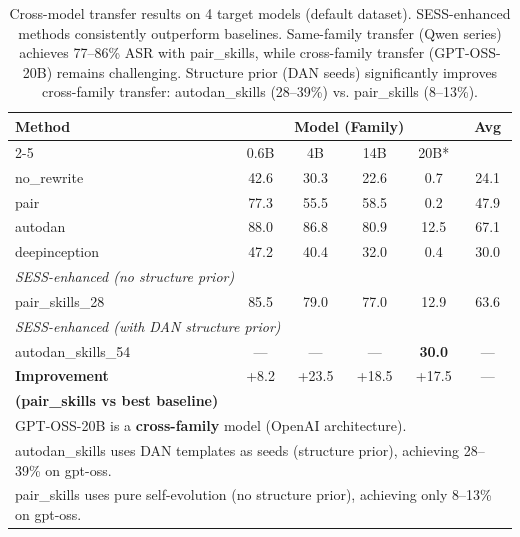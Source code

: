 \begin{table}[t]
\centering
\caption{Cross-model transfer results on 4 target models (default dataset). SESS-enhanced methods consistently outperform baselines. Same-family transfer (Qwen series) achieves 77--86\% ASR with pair\_skills, while cross-family transfer (GPT-OSS-20B) remains challenging. Structure prior (DAN seeds) significantly improves cross-family transfer: autodan\_skills (28--39\%) vs. pair\_skills (8--13\%).}
\label{tab:transfer_models}
\small
\begin{tabular}{lccccc}
\toprule
\textbf{Method} & \multicolumn{4}{c}{\textbf{Model (Family)}} & \textbf{Avg} \\
\cmidrule(lr){2-5}
 & 0.6B & 4B & 14B & 20B* & \\
\midrule
no\_rewrite & 42.6 & 30.3 & 22.6 & 0.7 & 24.1 \\
pair & 77.3 & 55.5 & 58.5 & 0.2 & 47.9 \\
autodan & 88.0 & 86.8 & 80.9 & 12.5 & 67.1 \\
deepinception & 47.2 & 40.4 & 32.0 & 0.4 & 30.0 \\
\midrule
\multicolumn{6}{l}{\textit{SESS-enhanced (no structure prior)}} \\
pair\_skills\_28 & 85.5 & 79.0 & 77.0 & 12.9 & 63.6 \\
\midrule
\multicolumn{6}{l}{\textit{SESS-enhanced (with DAN structure prior)}} \\
autodan\_skills\_54 & --- & --- & --- & \textbf{30.0} & --- \\
\midrule
\textbf{Improvement} & +8.2 & +23.5 & +18.5 & +17.5 & --- \\
\textbf{(pair\_skills vs best baseline)} & & & & & \\
\bottomrule
\multicolumn{6}{l}{\small *GPT-OSS-20B is a \textbf{cross-family} model (OpenAI architecture).} \\
\multicolumn{6}{l}{\small autodan\_skills uses DAN templates as seeds (structure prior), achieving 28--39\% on gpt-oss.} \\
\multicolumn{6}{l}{\small pair\_skills uses pure self-evolution (no structure prior), achieving only 8--13\% on gpt-oss.} \\
\end{tabular}
\end{table}
